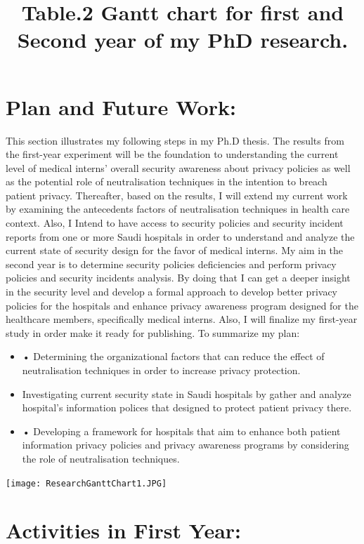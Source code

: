 \section{Plan and Future Work:}
This section illustrates my following steps in my Ph.D thesis. The results from the first-year experiment will be the foundation to understanding the current level of medical interns' overall security awareness about privacy policies as well as the potential role of neutralisation techniques in the intention to breach patient privacy. Thereafter, based on the results, I will extend my current work by examining the antecedents factors of neutralisation techniques in health care context.  Also, I Intend to have access to security policies and security incident reports from one or more Saudi hospitals in order to understand and analyze the current state of security design for the favor of medical interns. My aim in the second year is to determine security policies deficiencies and perform privacy policies and security incidents analysis. By doing that I can get a deeper insight in the security level and develop a formal approach to develop better privacy policies for the hospitals and enhance privacy awareness program designed for the healthcare members, specifically medical interns. Also, I will finalize my first-year study in order make it ready for publishing. To summarize my plan:
\begin{itemize}
	\item •	Determining the organizational factors that can reduce the effect of neutralisation techniques in order to increase privacy protection.
	 \item Investigating current security state in Saudi hospitals by gather and analyze hospital's information polices that designed to protect patient privacy there.
	 \item •	Developing a framework for hospitals that aim to enhance both patient information privacy policies and privacy awareness programs by considering the role of neutralisation techniques.
\end{itemize}

 \graphicspath{ {image/} }
 \begin{center}
 	\texttt{[image: ResearchGanttChart1.JPG]}
\end{center}
\begin{center}
	\title{Table.2 Gantt chart for first and Second year of my PhD research.}
\end{center}
\section{Activities in First Year:}

